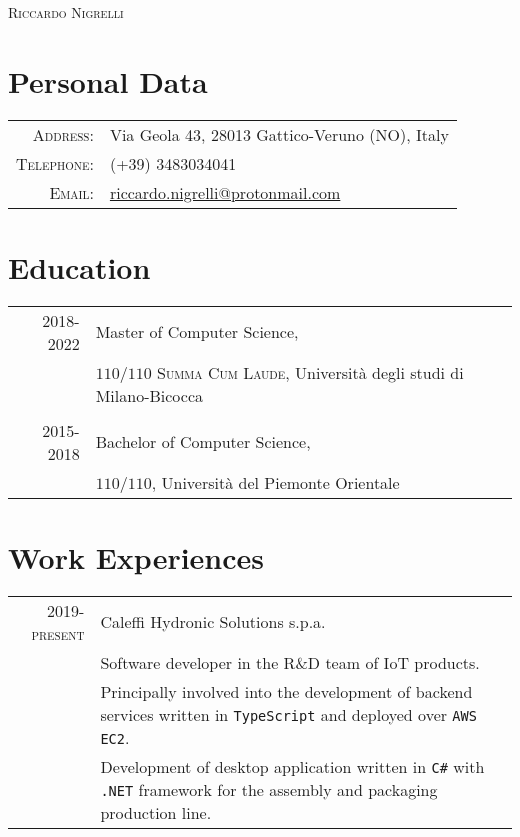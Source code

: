\documentclass[a4paper, 12pt]{article}
\begin{document}
  \thispagestyle{empty}

  \begin{center}
    \Huge\textsc{Riccardo Nigrelli}
  \end{center}

  \bigskip
  \section{Personal Data}
    \bigskip
    \begin{tabular}{rl}
      \textsc{Address:}   & Via Geola 43, 28013 Gattico-Veruno (NO), Italy\\
      \textsc{Telephone:} & (+39) 3483034041\\
      \textsc{Email:}     & \href{mailto:riccardo.nigrelli@protonmail.com}{riccardo.nigrelli@protonmail.com}
    \end{tabular}
  
  \bigskip
  \section{Education}
    \bigskip
    \begin{tabular}{rl}
      \textsc{2018-2022} & Master of Computer Science, \\ & $110/110$ \textsc{\footnotesize{Summa Cum Laude}}, Università degli studi di Milano-Bicocca \\ \\
      \textsc{2015-2018} & Bachelor of Computer Science, \\ & $110/110$, Università del Piemonte Orientale \\
    \end{tabular}

  \bigskip
  \section{Work Experiences}
    \begin{tabular}{r|p{12cm}}
      \textsc{2019-present} & Caleffi Hydronic Solutions s.p.a. \\ &
      \footnotesize{Software developer in the R\&D team of IoT products.} \\ &
      Principally involved into the development of backend services written in 
      \verb!TypeScript! and deployed over \verb!AWS EC2!. \\ &
      Development of desktop application written in \verb!C#! with \verb!.NET!
      framework for the assembly and packaging production line.
    \end{tabular}
\end{document}
